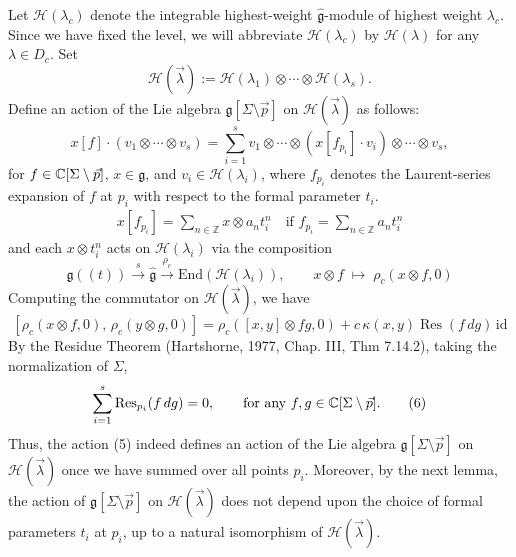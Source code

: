 \documentclass[12pt]{article}
\begin{document}
Let $\mathcal{H}(\lambda_c)$ denote the integrable highest-weight $\widehat{\mathfrak{g}}$-module of highest weight $\lambda_c$. Since we have fixed the level, we will abbreviate $\mathcal{H}(\lambda_c)$ by $\mathcal{H}(\lambda)$ for any $\lambda \in D_c$. Set
\begin{equation}
    \mathcal{H}(\vec{\lambda}) :=
    \mathcal{H}(\lambda_1) \otimes \cdots \otimes \mathcal{H}(\lambda_s).
    \tag{4}
\end{equation}
Define an action of the Lie algebra $\mathfrak{g}[\Sigma\setminus\vec{p}]$ on $\mathcal{H}(\vec{\lambda})$ as follows:
\begin{equation}
    x[f]\cdot(v_1\otimes\cdots\otimes v_s)
    = \sum_{i=1}^{s}
    v_1 \otimes \cdots \otimes (x[f_{p_i}]\cdot v_i) \otimes \cdots \otimes v_s,
    \tag{action}
\end{equation}
for $f \in \mathbb{C}[\Sigma\setminus\vec{p}]$, $x \in \mathfrak{g}$, and $v_i \in \mathcal{H}(\lambda_i)$,
where $f_{p_i}$ denotes the Laurent-series expansion of $f$ at $p_i$
with respect to the formal parameter $t_i$. \begin{align*}
    x[f_{p_i}] = \sum_{n \in \mathbb{Z}} x \otimes a_n t_i^n \quad \text{if } f_{p_i} = \sum_{n \in \mathbb{Z}} a_n t_i^n
\end{align*} and each $x \otimes t_i^n$ acts on $\mathcal{H}(\lambda_i)$ via the composition
\[
    \mathfrak g((t))
    \xrightarrow{s}
    \widehat{\mathfrak g}
    \xrightarrow{\rho_c}
    \mathrm{End}(\mathcal{H}(\lambda_i)), \qquad
    x\otimes f\;\mapsto\;\rho_c(x\otimes f,0)
\]
Computing the commutator on $\mathcal{H}(\vec{\lambda})$, we have
\[[\rho_c(x\otimes f,0),\,\rho_c(y\otimes g,0)]
    =\rho_c([x,y]\otimes fg,0) + c\,\kappa(x,y)\operatorname{Res}(f\,dg)\,\mathrm{id}\]
By the Residue Theorem (Hartshorne, 1977, Chap. III, Thm 7.14.2), taking the normalization of $\Sigma$,
\begin{equation}
    \sum_{i=1}^{s} \operatorname{Res}_{p_i}(f\,dg) = 0,
    \qquad \text{for any } f,g\in\mathbb{C}[\Sigma\setminus\vec{p}].
    \tag{6}
\end{equation}
Thus, the action (5) indeed defines an action of the Lie algebra $\mathfrak{g}[\Sigma\setminus\vec{p}]$
on $\mathcal{H}(\vec{\lambda})$ once we have summed over all points $p_i$. Moreover, by the next lemma, the action of $\mathfrak{g}[\Sigma\setminus\vec{p}]$ on $\mathcal{H}(\vec{\lambda})$ does not depend upon the choice of formal parameters $t_i$ at $p_i$, up to a natural isomorphism of $\mathcal{H}(\vec{\lambda})$.
\end{document}
